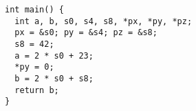 \begin{verbatim}
int main() {
  int a, b, s0, s4, s8, *px, *py, *pz;
  px = &s0; py = &s4; pz = &s8;
  s8 = 42;
  a = 2 * s0 + 23;
  *py = 0;
  b = 2 * s0 + s8;
  return b;
}
\end{verbatim}
